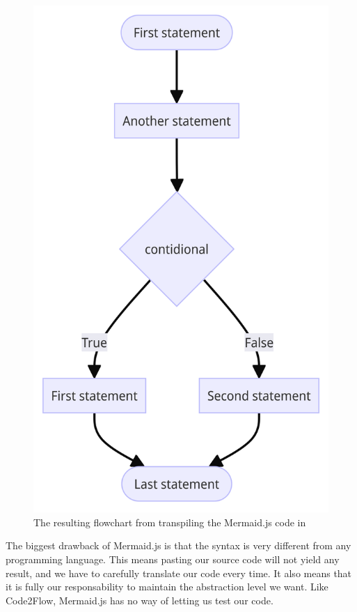 \begin{figure}[ht]
    \centering
    \includegraphics[scale=.07]{assets/chapter3/MermaidProgram.png}
    \caption{The resulting flowchart from transpiling the Mermaid.js code in }
    \label{A mermaid.js flowchart.}
\end{figure}

The biggest drawback of Mermaid.js is that the syntax is very different from any programming language. This means pasting our source code will not yield any result, and we have to carefully translate our code every time. It also means that it is fully our responsability to maintain the abstraction level we want. Like Code2Flow, Mermaid.js has no way of letting us test our code.